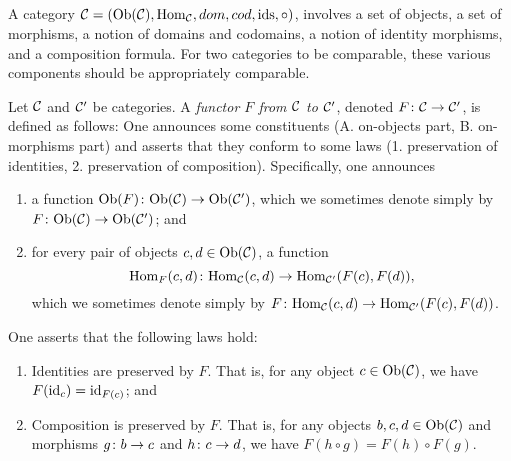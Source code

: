 \documentclass[CT4S-EN-RU]{subfiles}
\begin{document}

\subsection{}

A category $\mathcal{C}=(\textnormal{Ob}(\mathcal{C}),\textnormal{Hom}_\mathcal{C},dom,cod,\textnormal{ids},\circ)$, involves a set of objects, a set of morphisms, a notion of domains and codomains, a notion of identity morphisms, and a composition formula. For two categories to be comparable, these various components should be appropriately comparable.

\begin{definition}\label{def:functor}

Let $\mathcal{C}$ and $\mathcal{C}'$ be categories. A {\em functor $F$ from $\mathcal{C}$ to $\mathcal{C}'$}, denoted $F\colon\mathcal{C}\rightarrow\mathcal{C}'$, is defined as follows: One announces some constituents (A. on-objects part, B. on-morphisms part) and asserts that they conform to some laws (1. preservation of identities, 2. preservation of composition). Specifically, one announces
\begin{enumerate}[\hsp A.]
\item a function $\textnormal{Ob}(F)\colon\textnormal{Ob}(\mathcal{C})\rightarrow\textnormal{Ob}(\mathcal{C}')$, which we sometimes denote simply by $F\colon\textnormal{Ob}(\mathcal{C})\rightarrow\textnormal{Ob}(\mathcal{C}')$; and
\item for every pair of objects $c,d\in\textnormal{Ob}(\mathcal{C})$, a function $$\textnormal{Hom}_F(c,d)\colon\textnormal{Hom}_\mathcal{C}(c,d)\rightarrow\textnormal{Hom}_{\mathcal{C}'}(F(c),F(d)),$$ which we sometimes denote simply by $F\colon\textnormal{Hom}_\mathcal{C}(c,d)\rightarrow\textnormal{Hom}_{\mathcal{C}'}(F(c),F(d))$.
\end{enumerate}
One asserts that the following laws hold:
\begin{enumerate}[\hsp 1.]
\item Identities are preserved by $F$. That is, for any object $c\in\textnormal{Ob}(\mathcal{C})$, we have $F(\textnormal{id}_c)=\textnormal{id}_{F(c)}$; and
\item Composition is preserved by $F$. That is, for any objects $b,c,d\in\textnormal{Ob}(\mathcal{C})$ and morphisms $g\colon b\rightarrow c$ and $h\colon c\rightarrow d$, we have $F(h\circ g)=F(h)\circ F(g)$.
\end{enumerate}
\end{definition}
\end{document}
